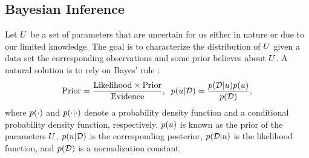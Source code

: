 \subsection{Bayesian Inference}
Let $U$ be a set of parameters that are uncertain for us either in nature or due to our limited knowledge. The goal is to characterize the distribution of $U$ given a data set the corresponding observations and some prior believes about $U$. A natural solution is to rely on Bayes' rule \cite{gelman2004}:
\begin{equation} \elabel{bayes}
  \text{Prior} = \frac{\text{Likelihood} \times \text{Prior}}{\text{Evidence}}, \;\; \f{\u | \data} = \frac{\f{\data | \u} \f{\u}}{\f{\data}},
\end{equation}
where $\f{\cdot}$ and $\f{\cdot | \cdot}$ denote a probability density function and a conditional probability density function, respectively. $\f{\u}$ is known as the prior of the parameters $U$, $\f{\u | \data}$ is the corresponding posterior, $\f{\data | \u}$ is the likelihood function, and $\f{\data}$ is a normalization constant.

